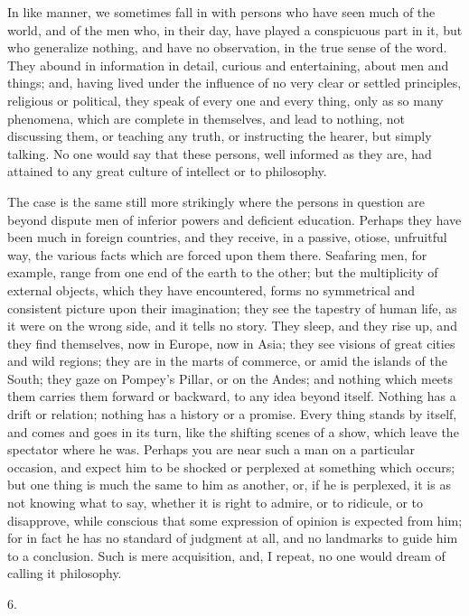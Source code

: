 In like manner, we sometimes fall in with persons who have seen
much of the world, and of the men who, in their day, have played a
conspicuous part in it, but who generalize nothing, and have no
observation, in the true sense of the word. They abound in information
in detail, curious and entertaining, about men and things; and, having
lived under the influence of no very clear or settled principles,
religious or political, they speak of every one and every thing, only
as so many phenomena, which are complete in themselves, and lead to
nothing, not discussing them, or teaching any truth, or instructing
the hearer, but simply talking. No one would say that these persons,
well informed as they are, had attained to any great culture of
intellect or to philosophy.

The case is the same still more strikingly where the persons in
question are beyond dispute men of inferior powers and deficient
education. Perhaps they have been much in foreign countries, and they
receive, in a passive, otiose, unfruitful way, the various facts which
are forced upon them there. Seafaring men, for example, range from one
end of the earth to the other; but the multiplicity of external
objects, which they have encountered, forms no symmetrical and
consistent picture upon their imagination; they see the tapestry of
human life, as it were on the wrong side, and it tells no story. They
sleep, and they rise up, and they find themselves, now in Europe, now
in Asia; they see visions of great cities and wild regions; they are
in the marts of commerce, or amid the islands of the South; they gaze
on Pompey's Pillar, or on the Andes; and nothing which meets them
carries them forward or backward, to any idea beyond itself. Nothing
has a drift or relation; nothing has a history or a promise. Every
thing stands by itself, and comes and goes in its turn, like the
shifting scenes of a show, which leave the spectator where he was.
Perhaps you are near such a man on a particular occasion, and expect
him to be shocked or perplexed at something which occurs; but one
thing is much the same to him as another, or, if he is perplexed, it
is as not knowing what to say, whether it is right to admire, or to
ridicule, or to disapprove, while conscious that some expression of
opinion is expected from him; for in fact he has no standard of
judgment at all, and no landmarks to guide him to a conclusion. Such
is mere acquisition, and, I repeat, no one would dream of calling it
philosophy.

6.

